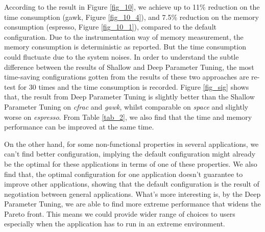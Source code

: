 According to the result in Figure \ref{fig_10}, we achieve up to 11\% reduction on the time consumption (gawk, Figure \ref{fig_10_4}), and 7.5\% reduction on the memory consumption (espresso, Figure \ref{fig_10_1}), compared to the default configuration. Due to the instrumentation way of memory measurement, the memory consumption is deterministic as reported. But the time consumption could fluctuate due to the system noises. In order to understand the subtle difference between the results of Shallow and Deep Parameter Tuning, the most time-saving configurations gotten from the results of these two approaches are re-test for 30 times and the time consumption is recorded. Figure \ref{fig_sig} shows that, the result from Deep Parameter Tuning is slightly better than the Shallow Parameter Tuning on \emph{cfrac} and \emph{gawk}, whilst comparable on \emph{space} and slightly worse on \emph{espresso}. From Table \ref{tab_2}, we also find that the time and memory performance can be improved at the same time. 

On the other hand, for some non-functional properties in several applications, we can't find better configuration, implying the default configuration might already be the optimal for these applications in terms of one of these properties. We also find that, the optimal configuration for one application doesn't guarantee to improve other applications, showing that the default configuration is the result of negotiation between general applications. What's more interesting is, by the Deep Parameter Tuning, we are able to find more extreme performance that widens the Pareto front. This means we could provide wider range of choices to users especially when the application has to run in an extreme environment.

